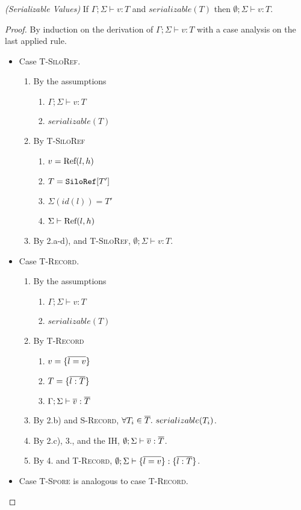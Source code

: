 \begin{thmun}
\emph{(Serializable Values)}
If $\Gamma ; \Sigma \vdash v : T$ and $serializable(T)$ then $\emptyset ; \Sigma \vdash v : T$.
\end{thmun}
\begin{proof}
By induction on the derivation of $\Gamma ; \Sigma \vdash v : T$ with a case analysis on the last applied rule.

\begin{itemize}
\item Case \textsc{T-SiloRef}.
\begin{enumerate}
\item By the assumptions
  \begin{enumerate}[label=(\alph*)]
  \item $\Gamma ; \Sigma \vdash v : T$
  \item $serializable(T)$
  \end{enumerate}
\item By \textsc{T-SiloRef}
  \begin{enumerate}[label=(\alph*)]
  \item $v = {\textrm{Ref}(l, h)}$
  \item $T = \texttt{SiloRef}[T']$
  \item $\Sigma(id(l)) = T'$
  \item $\Sigma \vdash {\textrm{Ref}(l, h)}$
  \end{enumerate}
\item By 2.a-d), and \textsc{T-SiloRef}, $\emptyset ; \Sigma \vdash v : T$.
\end{enumerate}

\item Case \textsc{T-Record}.
\begin{enumerate}
\item By the assumptions
  \begin{enumerate}[label=(\alph*)]
  \item $\Gamma ; \Sigma \vdash v : T$
  \item $serializable(T)$
  \end{enumerate}
\item By \textsc{T-Record}
  \begin{enumerate}[label=(\alph*)]
  \item $v = \{\overline{l = v}\}$
  \item $T = \{\overline{l : T}\}$
  \item $\Gamma ; \Sigma \vdash \overline{v} : \overline{T}$
  \end{enumerate}
\item By 2.b) and \textsc{S-Record}, $\forall T_i \in \overline{T}.~serializable(T_i)$.
\item By 2.c), 3., and the IH, $\emptyset ; \Sigma \vdash \overline{v} : \overline{T}$.
\item By 4. and \textsc{T-Record}, $\emptyset ; \Sigma \vdash \{\overline{l = v}\} : \{\overline{l : T}\}$.
\end{enumerate}

\item Case \textsc{T-Spore} is analogous to case \textsc{T-Record}.
\end{itemize}
\end{proof}

